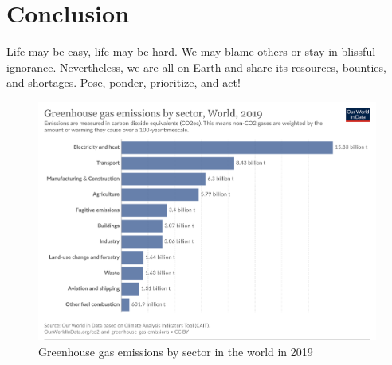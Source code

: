 \documentclass[12pt]{article}
\begin{document}
\section{Conclusion}

Life may be easy, life may be hard. We may blame others or stay in blissful ignorance. Nevertheless, we are all on Earth and share its resources, bounties, and shortages. Pose, ponder, prioritize, and act!

\clearpage

\begin{figure}
    \centering
    \includegraphics[width=\linewidth]{Figures/ghg-emissions-by-sector.png}
    \caption{Greenhouse gas emissions by sector in the world in 2019 \cite{GHG-Sector}}
    \label{fig:ghg-sector}
\end{figure}

\printbibliography
\end{document}
